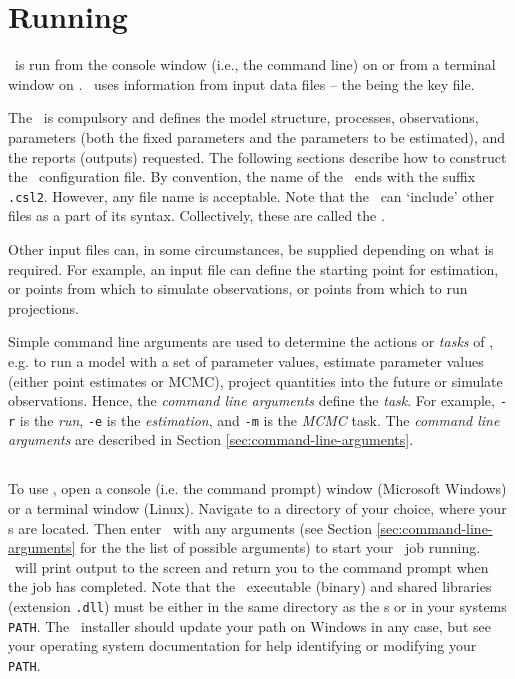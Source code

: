 \section{Running \CNAME\label{sec:running}}

\CNAME\ is run from the console window (i.e., the command line) on  or from a terminal window on . \CNAME\ uses information from input data files -- the \emph{\config{}} being the key file. 

The \config\ is compulsory and defines the model structure, processes, observations, parameters (both the fixed parameters and the parameters to be estimated), and the reports (outputs) requested. The following sections  describe how to construct the \CNAME\ configuration file. By convention, the name of the \config\ ends with the suffix \texttt{.csl2}. However, any file name is acceptable. Note that the \config\ can `include' other files as a part of its syntax. Collectively, these are called the \config.

Other input files can, in some circumstances, be supplied depending on what is required. For example, an input file can define the starting point for estimation, or points from which to simulate observations, or points from which to run projections.

Simple command line arguments are used to determine the actions or \emph{tasks} of \CNAME, e.g. to run a model with a set of parameter values, estimate parameter values (either point estimates or MCMC), project quantities into the future or simulate observations. Hence, the \emph{command line arguments} define the \emph{task}. For example, \texttt{-r} is the \emph{run}, \texttt{-e} is the \emph{estimation}, and \texttt{-m} is the \emph{MCMC} task. The \emph{command line arguments} are described in Section \ref{sec:command-line-arguments}.

\subsection{}

To use \CNAME, open a console (i.e. the command prompt) window (Microsoft Windows) or a terminal window (Linux). Navigate to a directory of your choice, where your \config s are located. Then enter \cname\ with any arguments (see Section \ref{sec:command-line-arguments} for the the list of possible arguments) to start your \CNAME\ job running. \CNAME\ will print output to the screen and return you to the command prompt when the job has completed. Note that the \CNAME\ executable (binary) and shared libraries (extension \texttt{.dll}) must be either in the same directory as the \config s or in your systems \texttt{PATH}. The \CNAME\ installer should update your path on Windows in any case, but see your operating system documentation for help identifying or modifying your \texttt{PATH}.


